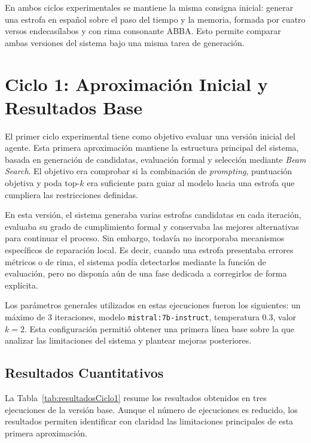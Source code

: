 \documentclass[12pt,a4paper,twoside,openright]{book}
\begin{document}
En ambos ciclos experimentales se mantiene la misma consigna inicial: generar una estrofa en español sobre el paso del tiempo y la memoria, formada por cuatro versos endecasílabos y con rima consonante ABBA.
Esto permite comparar ambas versiones del sistema bajo una misma tarea de generación.

\section{Ciclo 1: Aproximación Inicial y Resultados Base}

El primer ciclo experimental tiene como objetivo evaluar una versión inicial del agente. Esta primera aproximación mantiene la estructura principal del sistema, basada en generación de candidatas, evaluación formal y selección mediante \emph{Beam Search}.
El objetivo era comprobar si la combinación de \emph{prompting}, puntuación objetiva y poda top-$k$ era suficiente para guiar al modelo hacia una estrofa que cumpliera las restricciones definidas.

En esta versión, el sistema generaba varias estrofas candidatas en cada iteración, evaluaba su grado de cumplimiento formal y conservaba las mejores alternativas para continuar el proceso.
Sin embargo, todavía no incorporaba mecanismos específicos de reparación local. Es decir, cuando una estrofa presentaba errores métricos o de rima, el sistema podía detectarlos mediante la función de evaluación, pero no disponía aún de una fase dedicada a corregirlos de forma explícita.

Los parámetros generales utilizados en estas ejecuciones fueron los siguientes: un máximo de 3 iteraciones, modelo \texttt{mistral:7b-instruct}, temperatura 0.3, valor $k=2$.
Esta configuración permitió obtener una primera línea base sobre la que analizar las limitaciones del sistema y plantear mejoras posteriores.

\subsection{Resultados Cuantitativos}

La Tabla~\ref{tab:resultadosCiclo1} resume los resultados obtenidos en tres ejecuciones de la versión base. Aunque el número de ejecuciones es reducido, los resultados permiten identificar con claridad las limitaciones principales de esta primera aproximación.
\end{document}
